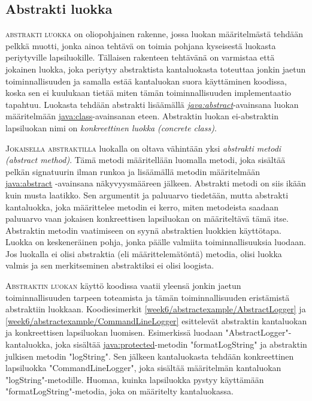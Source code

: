 \documentclass[openany]{book}
\newcommand{\newthought}[1]{\smallskip\textsc{#1}}
\newcommand{\eng}[1]{\textit{(#1)}}
\newcommand{\new}[1]{\textit{\gls{#1}}}
\newcommand{\neweng}[2]{\new{#1} \eng{#2}}
\newcommand{\java}[1]{\underline{\gls{java:#1}}}
\newcommand{\newjava}[1]{\textit{\java{#1}}}
\begin{document}
\subsection{Abstrakti luokka}
\label{abstract}

\newthought{\Gls{abstrakti luokka}} on oliopohjainen rakenne, jossa luokan määritelmästä tehdään
pelkkä muotti, jonka ainoa tehtävä on toimia pohjana kyseisestä luokasta periytyville
lapsiluokille. Tällaisen rakenteen tehtävänä on varmistaa että jokainen luokka, joka periytyy
abstraktista kantaluokasta toteuttaa jonkin jaetun toiminnallisuuden ja samalla estää kantaluokan
suora käyttäminen koodissa, koska sen ei kuulukaan tietää miten tämän toiminnallisuuden 
implementaatio tapahtuu. Luokasta tehdään abstrakti lisäämällä \newjava{abstract}-avainsana luokan
määritelmään \java{class}-avainsanan eteen. Abstraktin luokan ei-abstraktin lapsiluokan nimi on
\neweng{konkreettinen luokka}{concrete class}.

\newthought{Jokaisella abstraktilla} luokalla on oltava vähintään yksi 
\neweng{abstrakti metodi}{abstract method}. Tämä metodi määritellään luomalla metodi, joka
sisältää pelkän signatuurin ilman runkoa ja lisäämällä metodin määritelmään \java{abstract}
-avainsana näkyvyysmääreen jälkeen. Abstrakti metodi on siis ikään kuin musta laatikko. Sen
argumentit ja paluuarvo tiedetään, mutta abstrakti kantaluokka, joka määrittelee metodin ei
kerro, miten metodeista saadaan paluuarvo vaan jokaisen konkreettisen lapsiluokan on
määriteltävä tämä itse. Abstraktin metodin vaatimiseen on syynä abstraktien luokkien käyttötapa.
Luokka on keskeneräinen pohja, jonka päälle valmiita toiminnallisuuksia luodaan. Jos luokalla ei
olisi abstraktia (eli määrittelemätöntä) metodia, olisi luokka valmis ja sen merkitseminen
abstraktiksi ei olisi loogista.

\newthought{Abstraktin luokan} käyttö koodissa vaatii yleensä jonkin jaetun toiminnallisuuden
tarpeen toteamista ja tämän toiminnallisuuden eristämistä abstraktiin luokkaan. Koodiesimerkit
\ref{week6/abstractexample/AbstractLogger} ja \ref{week6/abstractexample/CommandLineLogger}
esittelevät abstraktin kantaluokan ja konkreettisen lapsiluokan luomisen. Esimerkissä
luodaan "AbstractLogger"-kantaluokka, joka sisältää \java{protected}-metodin "formatLogString" ja
abstraktin julkisen metodin "logString". Sen jälkeen kantaluokasta tehdään konkreettinen
lapsiluokka "CommandLineLogger", joka sisältää määritelmän kantaluokan "logString"-metodille.
Huomaa, kuinka lapsiluokka pystyy käyttämään "formatLogString"-metodia, joka on määritelty
kantaluokassa.
\end{document}
